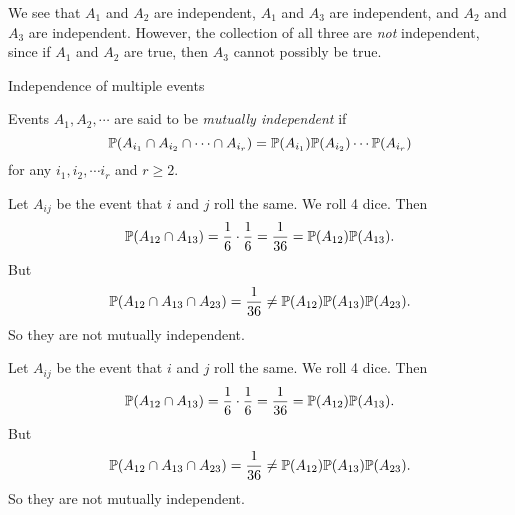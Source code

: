 \begin{note}
\begin{field}
\begin{eg}
\begin{center}
\begin{tabular}{cc}
          \bottomrule
        \end{tabular}
      \end{center}
      We see that $A_1$ and $A_2$ are independent, $A_1$ and $A_3$ are independent, and $A_2$ and $A_3$ are independent. However, the collection of all three are \emph{not} independent, since if $A_1$ and $A_2$ are true, then $A_3$ cannot possibly be true.
    \end{eg}
  \end{field}
  \xplain{}%
\end{note}

%
\begin{note}
  \begin{field}
    Independence of multiple events
  \end{field}
  \begin{field}
    \begin{defi}
      Events $A_1, A_2, \cdots$ are said to be \emph{mutually independent} if
      \[
        \P(A_{i_1}\cap A_{i_2} \cap \cdots \cap A_{i_r}) = \P(A_{i_1})\P(A_{i_2})\cdots \P(A_{i_r})
      \]
      for any $i_1, i_2, \cdots i_r$ and $r \geq 2$.
    \end{defi}
  \end{field}
  \xplain{}%
\end{note}

\begin{note}
  \begin{field}
    \begin{eg}
      Let $A_{ij}$ be the event that $i$ and $j$ roll the same. We roll 4 dice. Then
      \[
        \P(A_{12}\cap A_{13}) = \frac{1}{6}\cdot \frac{1}{6} = \frac{1}{36} = \P(A_{12})\P(A_{13}).
      \]
      But
      \[
        \P(A_{12}\cap A_{13}\cap A_{23}) = \frac{1}{36} \not= \P(A_{12})\P(A_{13})\P(A_{23}).
      \]
      So they are not mutually independent.
    \end{eg}
  \end{field}
  \begin{field}
    \begin{eg}
      Let $A_{ij}$ be the event that $i$ and $j$ roll the same. We roll 4 dice. Then
      \[
        \P(A_{12}\cap A_{13}) = \frac{1}{6}\cdot \frac{1}{6} = \frac{1}{36} = \P(A_{12})\P(A_{13}).
      \]
      But
      \[
        \P(A_{12}\cap A_{13}\cap A_{23}) = \frac{1}{36} \not= \P(A_{12})\P(A_{13})\P(A_{23}).
      \]
      So they are not mutually independent.
    \end{eg}
  \end{field}
  \xplain{}%
\end{note}

